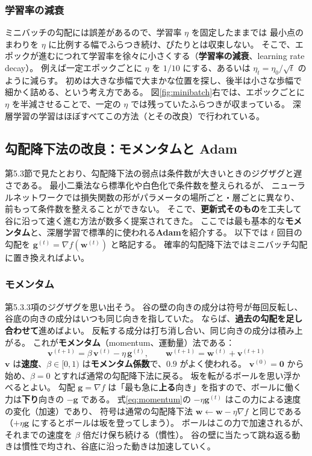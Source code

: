 \subsubsection{学習率の減衰}

ミニバッチの勾配には誤差があるので、学習率 $\eta$ を固定したままでは
最小点のまわりを $\eta$ に比例する幅でふらつき続け、ぴたりとは収束しない。
そこで、エポックが進むにつれて学習率を徐々に小さくする（\textbf{学習率の減衰}、learning rate decay）。
例えば一定エポックごとに $\eta$ を $1/10$ にする、あるいは $\eta_t = \eta_0 / \sqrt{t}$ のように減らす。
初めは大きな歩幅で大まかな位置を探し、後半は小さな歩幅で細かく詰める、という考え方である。
図\ref{fig:minibatch}右では、エポックごとに $\eta$ を半減させることで、一定の $\eta$ では残っていたふらつきが収まっている。
深層学習の学習はほぼすべてこの方法（とその改良）で行われている。


\subsection{勾配降下法の改良：モメンタムと Adam}

第5.3節で見たとおり、勾配降下法の弱点は条件数が大きいときのジグザグと遅さである。
最小二乗法なら標準化や白色化で条件数を整えられるが、
ニューラルネットワークでは損失関数の形がパラメータの場所ごと・層ごとに異なり、
前もって条件数を整えることができない。
そこで、\textbf{更新式そのもの}を工夫して谷に沿って速く進む方法が数多く提案されてきた。
ここでは最も基本的な\textbf{モメンタム}と、深層学習で標準的に使われる\textbf{Adam}を紹介する。
以下では $t$ 回目の勾配を $\bm{g}^{(t)} = \nabla f(\bm{w}^{(t)})$ と略記する。
確率的勾配降下法ではミニバッチ勾配に置き換えればよい。

\subsubsection{モメンタム}

第5.3.3項のジグザグを思い出そう。
谷の壁の向きの成分は符号が毎回反転し、谷底の向きの成分はいつも同じ向きを指していた。
ならば、\textbf{過去の勾配を足し合わせて}進めばよい。
反転する成分は打ち消し合い、同じ向きの成分は積み上がる。
これが\textbf{モメンタム}（momentum、運動量）法である：
\begin{equation}
  \bm{v}^{(t+1)} = \beta\,\bm{v}^{(t)} - \eta\,\bm{g}^{(t)}, \qquad
  \bm{w}^{(t+1)} = \bm{w}^{(t)} + \bm{v}^{(t+1)}
  \label{eq:momentum}
\end{equation}
$\bm{v}$ は\textbf{速度}、$\beta \in [0, 1)$ は\textbf{モメンタム係数}で、$0.9$ がよく使われる。
$\bm{v}^{(0)} = \bm{0}$ から始め、$\beta = 0$ とすれば通常の勾配降下法に戻る。
坂を転がるボールを思い浮かべるとよい。
勾配 $\bm{g} = \nabla f$ は「最も急に\textbf{上る}向き」を指すので、ボールに働く力は\textbf{下り}向きの $-\bm{g}$ である。
式\eqref{eq:momentum}の $-\eta\bm{g}^{(t)}$ はこの力による速度の変化（加速）であり、
符号は通常の勾配降下法 $\bm{w} \leftarrow \bm{w} - \eta\nabla f$ と同じである
（$+\eta\bm{g}$ にするとボールは坂を登ってしまう）。
ボールはこの力で加速されるが、それまでの速度を $\beta$ 倍だけ保ち続ける（慣性）。
谷の壁に当たって跳ね返る動きは慣性で均され、谷底に沿った動きは加速していく。

